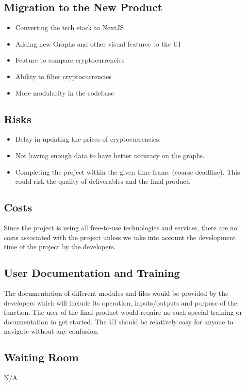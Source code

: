 \documentclass[12pt, titlepage]{article}
\begin{document}
\subsection{Migration to the New Product}
\begin{itemize}
    \item Converting the tech stack to NextJS
    \item Adding new Graphs and other visual features to the UI
    \item Feature to compare cryptocurrencies
    \item Ability to filter cryptocurrencies
    \item More modularity in the codebase
\end{itemize}

\subsection{Risks}
\begin{itemize}
    \item Delay in updating the prices of cryptocurrencies.
    \item Not having enough data to have better accuracy on the graphs.
    \item Completing the project within the given time frame (course deadline). This could risk the quality of deliverables and the final product. 
\end{itemize}

\subsection{Costs}
Since the project is using all free-to-use technologies and services, there are no costs associated with the project unless we take into account the development time of the project by the developers. 

\subsection{User Documentation and Training}
The documentation of different modules and files would be provided by the developers which will include its operation, inputs/outputs and purpose of the function. The user of the final product would require no such special training or documentation to get started. The UI should be relatively easy for anyone to navigate without any confusion.

\subsection{Waiting Room}
N/A
\end{document}
